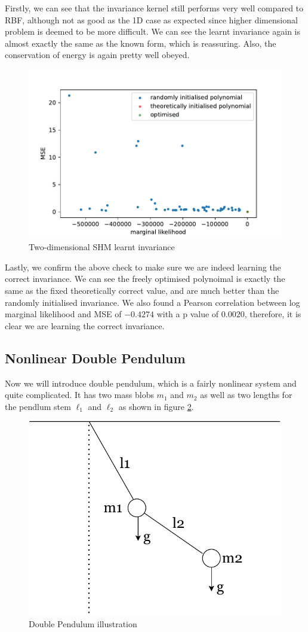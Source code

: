 \documentclass{statsmsc}
\begin{document}
Firstly, we can see that the invariance kernel still performs very well compared to RBF, although not as good as the 1D case as expected since higher dimensional problem is deemed to be more difficult.
We can see the learnt invariance again is almost exactly the same as the known form, which is reassuring.
Also, the conservation of energy is again pretty well obeyed.

\begin{figure}[H] 
  \includegraphics[width=0.8\linewidth]{../codes/figures/shm_2d_polynomial.pdf}
  \centering
  \caption{Two-dimensional SHM learnt invariance}
  \label{fig:shm_2d_poly}
\end{figure}

Lastly, we confirm the above check to make sure we are indeed learning the correct invariance.
We can see the freely optimised polynoimal is exactly the same as the fixed theoretically correct value, and are much better than the randomly initialised invariance. 
We also found a Pearson correlation between log marginal likelihood and MSE of $-0.4274$ with a p value of $0.0020$, therefore, it is clear we are learning the correct invariance. 

\subsection{Nonlinear Double Pendulum}
Now we will introduce double pendulum, which is a fairly nonlinear system and quite complicated. 
It has two mass blobs $m_1$ and $m_2$ as well as two lengths for the pendlum stem $\ell_1$ and $\ell_2$ as shown in figure \ref{fig:double_pendulum_diagram}.

\begin{figure}[H]
        \centering
        \includegraphics[width=0.4\linewidth]{../figures/doublependulum.pdf}
        \caption{Double Pendulum illustration}
        \label{fig:double_pendulum_diagram}
\end{figure}
\end{document}
